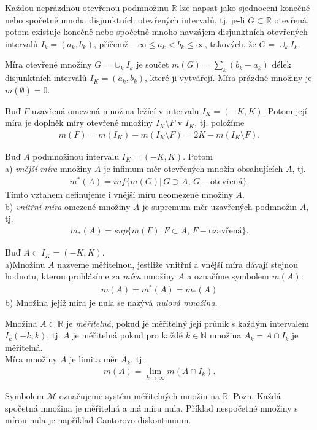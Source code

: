 Každou neprázdnou otevřenou podmnožinu $\mathbb{R}$ lze napsat jako sjednocení
konečně nebo spočetně mnoha disjunktních otevřených intervalů, tj. je-li $G\subset \mathbb{R}$ otevřená, potom existuje konečně nebo spočetně mnoho navzájem disjunktních otevřených intervalů $I_k =(a_k, b_k)$, přičemž $-\infty\leq a_k<b_k\leq \infty$, takových, že $G = \cup_kI_k$.
\begin{definition}
Míra otevřené množiny $G=\cup_k I_k$ je součet $m(G)=\sum_k(b_k-a_k)$ délek disjunktních intervalů $I_K=(a_k,b_k)$, které ji vytvářejí. Míra prázdné množiny je $m(\emptyset)=0$.
\end{definition}
\begin{definition}
Buď $F$ uzavřená omezená množina ležící v intervalu $I_K=(-K,K)$. Potom její míra je doplněk míry otevřené množiny $I_K \setminus F$ v $I_K$, tj. položíme
\begin{align*}
m(F) = m(I_K) - m(I_K \setminus F) = 2K - m(I_K\setminus F).
\end{align*}
\end{definition}
\begin{definition}
Buď $A$ podmnožinou intervalu $I_K=(-K,K)$. Potom\\
a) \textit{vnější míra} množiny $A$ je infimum měr otevřených množin obsahujících $A$, tj. 
\begin{align*}
m^*(A) = inf\{ m(G)|\,G \supset A,\,G-\text{otevřená}\}.
\end{align*}
Tímto vztahem definujeme i vnější míru neomezené množiny $A$.\\
b) \textit{vnitřní míra} omezené množiny $A$ je supremum měr uzavřených podmnožin $A$, tj. 
\begin{align*}
m_*(A)=sup\{m(F)|\,F\subset A,\,F-\text{uzavřená} \}.
\end{align*}
\end{definition}
\begin{definition}
Buď $A\subset I_K=(-K,K).$\\
a)Množinu $A$ nazveme měřitelnou, jestliže vnitřní a vnější míra dávají stejnou hodnotu, kterou prohlásíme za \textit{míru} množiny $A$ a označíme symbolem $m(A)$:
\begin{align*}
m(A)=m^*(A)=m_*(A)
\end{align*}
b) Množina jejíž míra je nula se nazývá \textit{nulová množina}.
\end{definition}
\begin{definition}
Množina $A\subset\mathbb{R}$ je \textit{měřitelná}, pokud je měřitelný její průnik s každým intervalem $I_k(-k,k)$, tj. $A$ je měřitelná pokud pro každé $k\in\mathbb{N}$ množina $A_k=A\cap I_k$ je měřitelná.
\\Míra množiny $A$ je limita měr $A_k$, tj. 
\begin{align*}
m(A)=\lim_{k\rightarrow\infty}m(A\cap I_k).
\end{align*}
\end{definition}
Symbolem $\mathscr{M}$ označujeme systém měřitelných množin na $\mathbb{R}$.
Pozn. Každá spočetná množina je měřitelná a má míru nula. Příklad nespočetné množiny s mírou nula je například Cantorovo diskontinuum.

